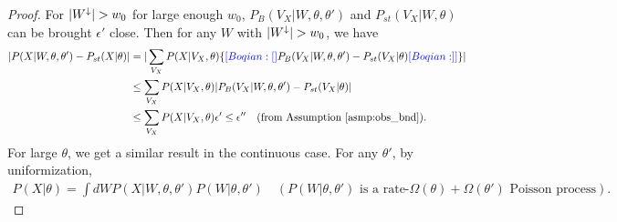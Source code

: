 \begin{proof}
For ${|W^\downarrow}| > w_{0}$ for 
large enough $w_0$,
$P_B(V_X | W, \theta, \theta')$ and  $P_{st}(V_X | W, \theta)$ can be
brought $\epsilon'$ close.
Then for any $W$ with ${|W^\downarrow}| > w_0$, we have
\begin{align*}
  |P(X|W , \theta, \theta') - P_{st}(X | \theta)| &= | \sum_{V_X} P(X|V_X, \theta)\{ \textcolor{blue}{[Boqian: []}P_B(V_X | W, \theta, \theta') -  P_{st}(V_X | \theta) \textcolor{blue}{[Boqian: ]]} \}|\\
& \leq \sum_{V_X} P(X | V_X, \theta)|P_B(V_X | W, \theta, \theta') -  P_{st}(V_X | \theta)|\\
& \leq \sum_{V_X} P(X | V_X, \theta){\epsilon'} \le \epsilon'' \quad (\text{from Assumption}~\ref{asmp:obs_bnd}).
\end{align*}
For large $\theta$, we get a similar result in the continuous 
case. For any $\theta'$, by uniformization, 
\begin{align*}
P(X | \theta) %
= \int dW P(X | W, \theta, \theta') P(W | \theta, \theta') %
\quad 
(\text{$P(W|\theta,\theta')$ is a rate-$\Omega(\theta) + 
\Omega(\theta')$ Poisson process}).
\end{align*}

\end{proof}
